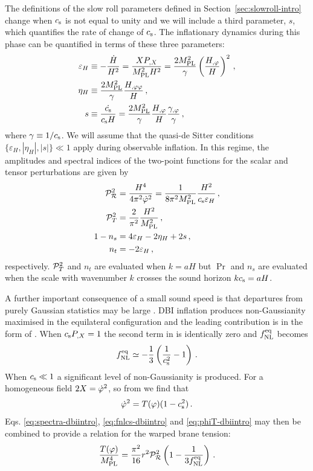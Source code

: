 The definitions of the slow roll parameters defined in
Section~\ref{sec:slowroll-intro} 
change when $c_\mathrm{s}$ is not equal to unity and we
will include a third parameter, $s$, which quantifies the rate of change of $c_\mathrm{s}$.
The inflationary dynamics during this phase can  
be quantified in terms of these three parameters: 
% 
\begin{align}
\label{eq:epsdefn-dbiintro}
\varepsilon_H &\equiv -\frac{\dot{H}}{H^2}
= \frac{XP_{,X}}{M_{\mathrm{PL}}^2H^2} 
= \frac{2M_{\mathrm{PL}}^2}{\gamma} \left( \frac{H_{,\varphi}}{H} \right)^2 \,,\\
\label{eq:defeta-dbiintro}
\eta_H &\equiv  \frac{2M_{\mathrm{PL}}^2}{\gamma}\frac{H_{,\varphi\varphi}}{H} \,,\\
\label{eq:defs-dbiintro}
s &\equiv \frac{\dot{c_\mathrm{s}}}{c_\mathrm{s} H} 
= \frac{2M_{\mathrm{PL}}^2}{\gamma} \frac{H_{,\varphi}}{H}\frac{\gamma_{,\varphi}}{\gamma}  \,,
\end{align}
% 
where $\gamma \equiv 1/c_\mathrm{s}$. 
We will assume that the quasi-de Sitter conditions 
$\{ \varepsilon_H, |\eta_H | , |s | \}  \ll 1$ apply during observable inflation. 
In this regime, the amplitudes and spectral indices of the two-point functions 
for the scalar and tensor perturbations are given by \cite{gm}
% 
\begin{align}
\label{eq:spectra-dbiintro}
\mathcal{P}_{\mathcal{R}}^2  &= \frac{H^4}{4\pi^2\dot{\varphi}^2} =\frac{1}{8 \pi^2 M_{\mathrm{PL}}^2}
\frac{H^2}{c_\mathrm{s} \varepsilon_H}\,,
\\
\mathcal{P}_T^2 &= \frac{2}{\pi^2} \frac{H^2}{M_{\mathrm{PL}}^2} \,,
\\
\label{indices}
1-n_s &= 4 \varepsilon_H -2\eta_H  +2s \,,
\\
 n_t &= -2\varepsilon_H  \,,
\end{align}
% 
respectively. $\mathcal{P}_T^2$ and $n_t$ are evaluated when $k=aH$ but $\Pr$ and $n_s$ are
evaluated 
when the scale with wavenumber $k$ crosses 
the sound horizon $k c_\mathrm{s} = aH$.  

A further important consequence of a small sound speed is that departures  
from purely Gaussian statistics may be large 
\cite{brane6,brane11,lidser3,chenetal}. 
DBI inflation produces non-Gaussianity maximised in the equilateral
configuration and the leading contribution is in the form of
. 
When $c_\mathrm{s}P_{,X}=1$ the second term in 
 is identically zero and $f_{\mathrm{NL}}^{\mathrm{eq}}$ becomes
\cite{chenetal,lidser2}
% 
\begin{equation}
\label{eq:fnlcs-dbiintro}
f_{\mathrm{NL}}^{\mathrm{eq}} \simeq -\frac{1}{3} \left( \frac{1}{c_\mathrm{s}^2} -1 \right) \,.
\end{equation}
% 
When $c_\mathrm{s}\ll1$ a significant level of non-Gaussianity is produced.
% 
For a homogeneous field $2X = \dot{\varphi}^2$, so from  we
find that
\begin{equation}
\label{eq:phiT-dbiintro}
 \dot{\varphi}^2 = T(\varphi)(1-c_\mathrm{s}^2)\,.
\end{equation}
Eqs. \eqref{eq:spectra-dbiintro},
\eqref{eq:fnlcs-dbiintro} and \eqref{eq:phiT-dbiintro}
may then be combined to provide a relation for the warped brane tension: 
% 
\begin{equation}
\label{eq:obswarp-dbiintro}
\frac{T (\varphi)}{M_{\mathrm{PL}}^4}  = 
\frac{\pi^2}{16} r^2\mathcal{P}_{\mathcal{R}}^2  \left( 1-\frac{1}{3f_{\mathrm{NL}}^{\mathrm{eq}}} \right) \,.
\end{equation}
% 


